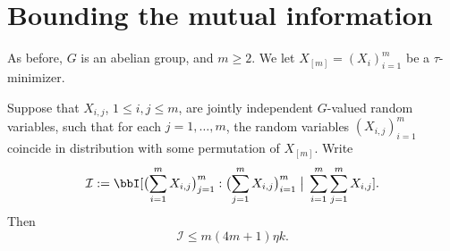 \section{Bounding the mutual information}

As before, $G$ is an abelian group, and $m\geq 2$.  We let $X_{[m]} = (X_i)_{i =1}^m$ be a $\tau$-minimizer.

\begin{proposition}\label{key}\leanok
Suppose that $X_{i,j}$, $1 \leq i,j \leq m$, are jointly independent $G$-valued random variables, such that for each $j = 1,\dots,m$, the random variables $(X_{i,j})_{i = 1}^m$ coincide in distribution with some permutation of $X_{[m]}$.
  Write
  \[
    {\mathcal I} := \bbI[ \bigl(\sum_{i=1}^m X_{i,j}\bigr)_{j =1}^{m} : \bigl(\sum_{j=1}^m X_{i,j}\bigr)_{i = 1}^m \; \big| \; \sum_{i=1}^m \sum_{j = 1}^m  X_{i,j} ].
  \]
Then
  \begin{equation}\label{I-ineq}
    {\mathcal I} \leq m(4m+1) \eta k.
  \end{equation}
\end{proposition}


